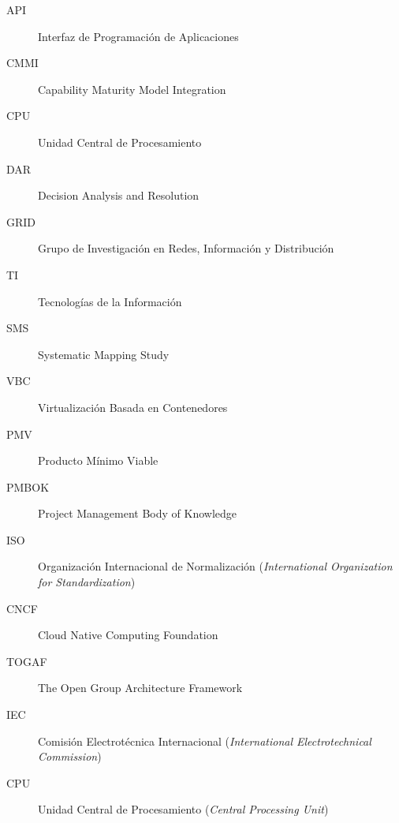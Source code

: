 \label{cap:siglas}

\begin{description}
  \item[API] Interfaz de Programación de Aplicaciones
  \item[CMMI] Capability Maturity Model Integration
  \item[CPU] Unidad Central de Procesamiento
  \item[DAR] Decision Analysis and Resolution
  \item[GRID] Grupo de Investigación en Redes, Información y Distribución
  \item[TI] Tecnologías de la Información
  \item[SMS] Systematic Mapping Study
  \item[VBC] Virtualización Basada en Contenedores
  \item[PMV] Producto Mínimo Viable
  \item[PMBOK] Project Management Body of Knowledge
  \item[ISO] Organización Internacional de Normalización (\textit{International Organization for Standardization})
  \item[CNCF] Cloud Native Computing Foundation
  \item[TOGAF] The Open Group Architecture Framework
  \item[IEC] Comisión Electrotécnica Internacional (\textit{International Electrotechnical Commission})
  \item[CPU] Unidad Central de Procesamiento (\textit{Central Processing Unit})
\end{description}